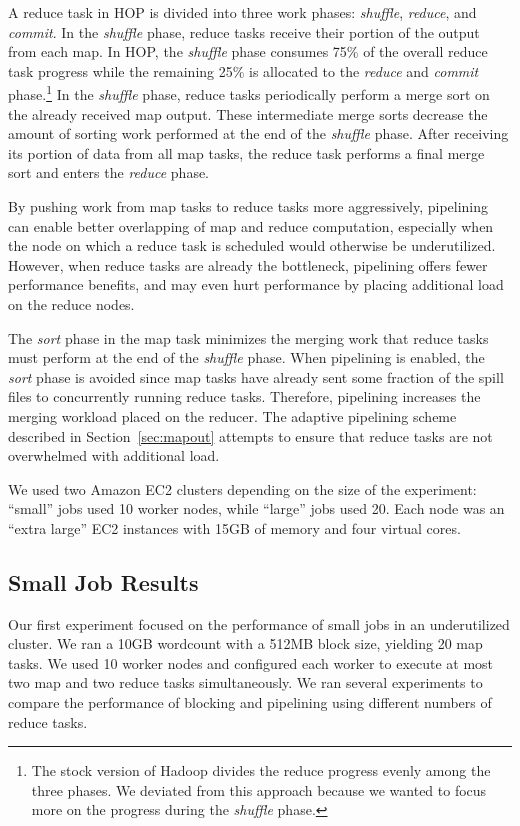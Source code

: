 A reduce task in HOP is divided into three work phases: {\em shuffle}, {\em
  reduce}, and {\em commit}.  In the {\em shuffle} phase, reduce tasks receive
their portion of the output from each map.  In HOP, the {\em shuffle} phase
consumes 75\% of the overall reduce task progress while the remaining 25\% is
allocated to the {\em reduce} and {\em commit} phase.\footnote{The stock version
  of Hadoop divides the reduce progress evenly among the three phases. We
  deviated from this approach because we wanted to focus more on the progress
  during the {\em shuffle} phase.}  In the {\em shuffle} phase, reduce tasks
periodically perform a merge sort on the already received map output. These
intermediate merge sorts decrease the amount of sorting work performed at the
end of the {\em shuffle} phase. After receiving its portion of data from all map
tasks, the reduce task performs a final merge sort and enters the {\em reduce}
phase.

By pushing work from map tasks to reduce tasks more aggressively, pipelining can
enable better overlapping of map and reduce computation, especially when the
node on which a reduce task is scheduled would otherwise be
underutilized. However, when reduce tasks are already the bottleneck, pipelining
offers fewer performance benefits, and may even hurt performance by placing
additional load on the reduce nodes.

The {\em sort} phase in the map task minimizes the merging work that reduce
tasks must perform at the end of the {\em shuffle} phase. When pipelining is
enabled, the {\em sort} phase is avoided since map tasks have already sent some
fraction of the spill files to concurrently running reduce tasks. Therefore,
pipelining increases the merging workload placed on the reducer. The adaptive
pipelining scheme described in Section~\ref{sec:mapout} attempts to ensure that
reduce tasks are not overwhelmed with additional load.

We used two Amazon EC2 clusters depending on the size of the experiment:
``small'' jobs used 10 worker nodes, while ``large'' jobs used 20. Each node
was an ``extra large'' EC2 instances with 15GB of memory and four virtual cores.

\subsection{Small Job Results}
Our first experiment focused on the performance of small jobs in an
underutilized cluster. We ran a 10GB wordcount with a 512MB block size, yielding
20 map tasks. We used 10 worker nodes and configured each worker to execute at
most two map and two reduce tasks simultaneously. We ran several experiments to
compare the performance of blocking and pipelining using different numbers of
reduce tasks.

